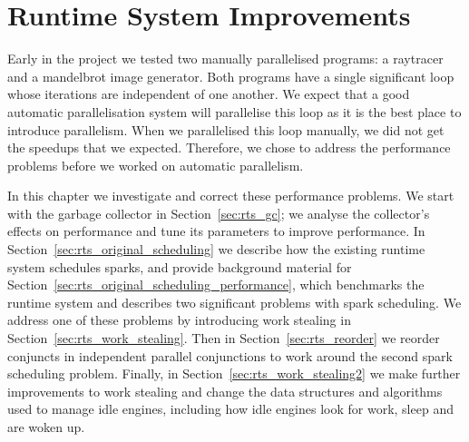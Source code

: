 
\chapter{Runtime System Improvements}
\label{chap:rts}


Early in the project
we tested two manually parallelised programs:
a raytracer and a mandelbrot image generator.
Both programs have a single significant loop
whose iterations are independent of one another.
We expect that a good automatic parallelisation system will parallelise this
loop as it is the best place to introduce parallelism.
When we parallelised this loop manually,
we did not get the speedups that we expected.
Therefore,
we chose to address the performance problems
before we worked on automatic parallelism.

In this chapter we investigate and correct these performance problems.
We start with the garbage collector in Section~\ref{sec:rts_gc};
we analyse the collector's effects on performance and tune its parameters
to improve performance.
In Section~\ref{sec:rts_original_scheduling} we describe how the existing runtime
system schedules sparks,
and provide background material for
Section~\ref{sec:rts_original_scheduling_performance},
which benchmarks the runtime system and describes two significant problems with
spark scheduling.
We address one of these problems by introducing work stealing in
Section~\ref{sec:rts_work_stealing}.
Then in Section~\ref{sec:rts_reorder} we reorder conjuncts in independent
parallel conjunctions to work around the second spark scheduling problem.
Finally, in Section~\ref{sec:rts_work_stealing2} we make further
improvements to
work stealing and change the data structures and algorithms used to manage
idle engines,
including how idle engines look for work, sleep and are woken up.






%


%

